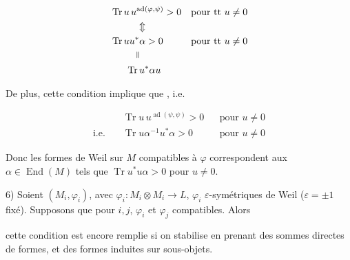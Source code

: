 \[
\begin{aligned}
&\operatorname{Tr}u\,u^{\operatorname{ad}(\varphi,\psi)}>0 &&\text{pour tt }u\ne0\\
&\hspace{2.7em}\Updownarrow\\
&\operatorname{Tr}uu^*\alpha>0 &&\text{pour tt }u\ne0\\
&\hspace{2.7em}\rotatebox{90}{$=$}\\
&\hspace{1.6em}\operatorname{Tr}u^*\alpha u
\end{aligned}
\]

De plus, cette condition implique que  , i.e.

\[
\begin{aligned}
&\operatorname{Tr}u\,u^{\operatorname{ad}(\psi,\psi)}>0 &&\text{pour }u\ne0\\
\text{i.e.}\quad &\operatorname{Tr}u\alpha^{-1}u^*\alpha>0 &&\text{pour }u\ne0
\end{aligned}
\]

Donc les formes de Weil sur $M$ compatibles à $\varphi$ correspondent aux  $\alpha\in\operatorname{End}(M)$ tels que $\operatorname{Tr}u^*u\alpha>0$ pour $u\ne0$. 


6) Soient  $(M_i,\varphi_i)$,  avec $\varphi_i:M_i\otimes M_i\to L$, $\varphi_i$ $\varepsilon$-symétriques de Weil ($\varepsilon=\pm1$ fixé). Supposons que pour $i,j$, $\varphi_i$ et $\varphi_j$ compatibles. Alors


cette condition est encore remplie si on stabilise en prenant des sommes directes de formes, et des formes induites sur sous-objets.


